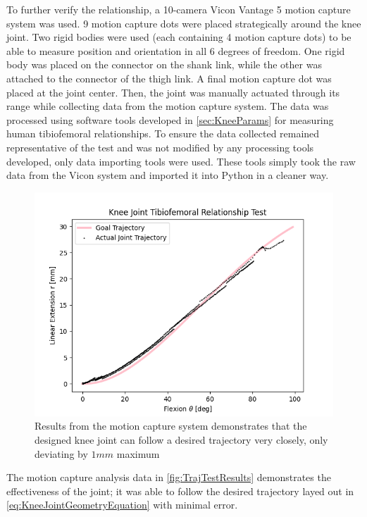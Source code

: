 To further verify the relationship, a 10-camera Vicon Vantage 5 motion capture system was used. 9 motion capture dots were placed strategically around the knee joint. Two rigid bodies were used (each containing 4 motion capture dots) to be able to measure position and orientation in all 6 degrees of freedom. One rigid body was placed on the connector on the shank link, while the other was attached to the connector of the thigh link. A final motion capture dot was placed at the joint center. Then, the joint was manually actuated through its range while collecting data from the motion capture system. The data was processed using software tools developed in \autoref{sec:KneeParams} for measuring human tibiofemoral relationships. To ensure the data collected remained representative of the test and was not modified by any processing tools developed, only data importing tools were used. These tools simply took the raw data from the Vicon system and imported it into Python in a cleaner way.

\begin{figure}[ht!]
    \centering
    \includegraphics[width=0.8\linewidth]{Figures/Design/FlexionExtensionKneeJoint.png}
    \caption{Results from the motion capture system demonstrates that the designed knee joint can follow a desired trajectory very closely, only deviating by \(1mm\) maximum}
    \label{fig:TrajTestResults}
\end{figure}

The motion capture analysis data in \autoref{fig:TrajTestResults} demonstrates the effectiveness of the joint; it was able to follow the desired trajectory layed out in \autoref{eq:KneeJointGeometryEquation} with minimal error. 